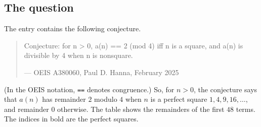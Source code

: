 \documentclass[11pt,a4paper]{article}
\theoremstyle{definition}
\theoremstyle{remark}
\begin{document}
\subsection{The question}
The entry contains the following conjecture.
\begin{quote}\small\ttfamily\raggedright Conjecture: for n > 0, a(n) == 2 (mod 4) iff n is a square, and a(n) is divisible by 4 when n is nonsquare.\par\smallskip\hfill\textrm{--- OEIS A380060, Paul D. Hanna, February 2025}\end{quote}

(In the OEIS notation, \texttt{==} denotes congruence.) So, for $n>0$, the conjecture says that $a(n)$ has remainder $2$ modulo $4$ when $n$ is a perfect square
$1,4,9,16,\dots$, and remainder $0$ otherwise. The table shows the remainders of the first $48$ terms. The indices in
bold are the perfect squares.
\end{document}

